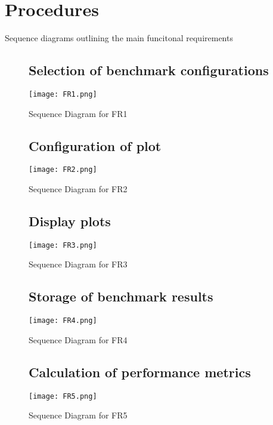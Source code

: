 \section{Procedures}

Sequence diagrams outlining the main funcitonal requirements

\begin{figure}[h]
\subsection{Selection of benchmark configurations}
  \centering
  \texttt{[image: FR1.png]}
  \caption{Sequence Diagram for FR1}
\end{figure}

\begin{figure}[h]
\subsection{Configuration of plot}
  \centering
  \texttt{[image: FR2.png]}
  \caption{Sequence Diagram for FR2}
\end{figure}

\begin{figure}[h]
\subsection{Display plots}
  \centering
  \texttt{[image: FR3.png]}
  \caption{Sequence Diagram for FR3}
\end{figure}

\begin{figure}[h]
\subsection{Storage of benchmark results}
  \centering
  \texttt{[image: FR4.png]}
  \caption{Sequence Diagram for FR4}
\end{figure}

\begin{figure}[h]
\subsection{Calculation of performance metrics}
  \centering
  \texttt{[image: FR5.png]}
  \caption{Sequence Diagram for FR5}
\end{figure}
